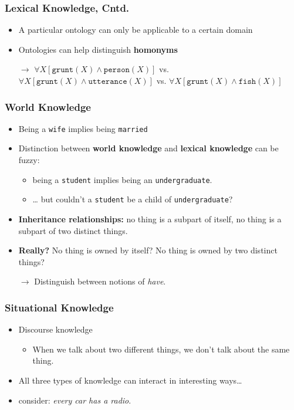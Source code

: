 \documentclass{beamer}
\newcommand{\stress}{\textbf}
\begin{document}
\begin{frame}
\frametitle{Lexical Knowledge, Cntd.}
  \begin{itemize}
    \item A particular ontology can only be applicable to a certain domain
    \item Ontologies can help distinguish \stress{homonyms}
    \item[$\to$] $\forall X [\texttt{grunt}(X) \wedge \texttt{person}(X)]$ vs.  $\forall X [ \texttt{grunt}(X) \wedge \texttt{utterance}(X) ]$
    vs. $\forall X [\texttt{grunt}(X) \wedge \texttt{fish}(X)]$
  \end{itemize}
\end{frame}

\begin{frame}
\frametitle{World Knowledge}
  \begin{itemize}
    \item Being a \texttt{wife} implies being \texttt{married}
    \item Distinction between \stress{world knowledge} and \stress{lexical
    knowledge} can be fuzzy:
    \begin{itemize}
      \item being a \texttt{student} implies being an \texttt{undergraduate}.
      \item \ldots{} but couldn't a \texttt{student} be a child of \texttt{undergraduate}?
    \end{itemize}
    \item \stress{Inheritance relationships:} no thing is a subpart of itself, no thing is a subpart of two distinct things.
    \item \stress{Really?} No thing is owned by itself? No thing is owned by two
    distinct things?
    \item[$\to$] Distinguish between notions of \emph{have}.
  \end{itemize}
\end{frame}

\begin{frame}
\frametitle{Situational Knowledge}
  \begin{itemize}
    \item Discourse knowledge
    \begin{itemize}
      \item When we talk about two different things, we don't talk about the
	same thing.
    \end{itemize}
    \item All three types of knowledge can interact in interesting
      ways\ldots{}\pause
    \item consider: \emph{every car has a radio}.
  \end{itemize}
\end{frame}
\end{document}
